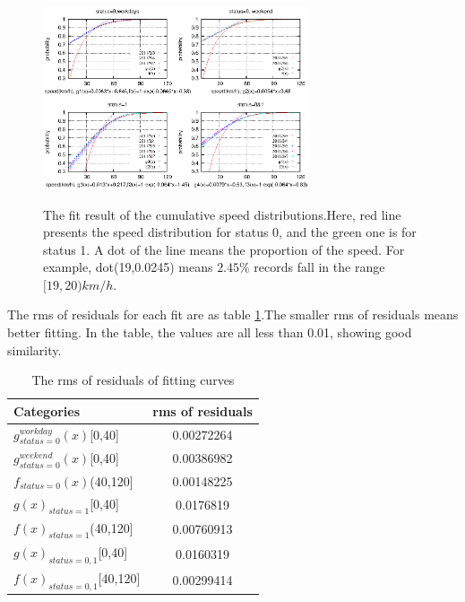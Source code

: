 \begin{figure}[htbp]
\centering
\includegraphics[width=0.7\textwidth]{figures_201103/CCDF_Speed_distribution_w_fit_line.eps}\\
\caption{The fit result of the cumulative speed distributions.Here, red line presents the speed distribution for status 0, and the green one is for status 1. A dot of the line means the proportion of the speed. For example, dot(19,0.0245) means $2.45\%$ records fall in the range $[19,20)km/h$.}\label{figure_fit_ccdf_speed}
\end{figure}

The rms of residuals for each fit are as table \ref{table_rms}.The smaller rms of residuals means better fitting. In the table, the values are all less than 0.01, showing good similarity.

\begin{table}[!t]
\caption{The rms of residuals of fitting curves}\label{table_rms}
\centering
\begin{tabular}{l|c}
  \hline
  Categories & rms of residuals  \\
  \hline
  $g_{status=0}^{workday}(x)$[0,40] & 0.00272264\\
  $g_{status=0}^{weekend}(x)$[0,40] & 0.00386982  \\
  $f_{status=0}(x)$(40,120] & 0.00148225\\
  $g(x)_{status=1}$[0,40]& 0.0176819 \\
  $f(x)_{status=1}$(40,120] & 0.00760913\\
  $g(x)_{status=0,1}$[0,40]& 0.0160319\\
  $f(x)_{status=0,1}$[40,120]& 0.00299414\\
  \hline
\end{tabular}
\end{table}

